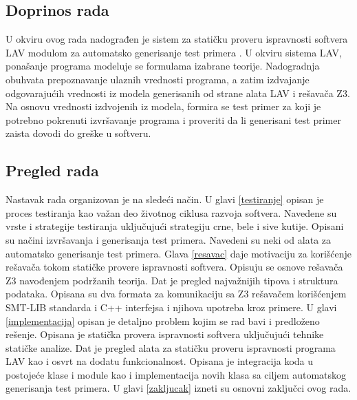 \documentclass[12pt,oneside]{memoir}
\begin{document}
\subsection{Doprinos rada}

U okviru ovog rada nadograđen je sistem za statičku proveru ispravnosti softvera LAV modulom za automatsko generisanje test primera \cite{LAVTool}. U okviru sistema
LAV, ponašanje programa modeluje se formulama izabrane teorije. Nadogradnja obuhvata prepoznavanje ulaznih vrednosti programa, a zatim izdvajanje odgovarajućih vrednosti iz modela generisanih od strane alata LAV i rešavača Z3. Na osnovu vrednosti izdvojenih iz modela, formira se test primer za koji je potrebno pokrenuti izvršavanje programa i proveriti da li generisani test primer zaista dovodi do greške u softveru.

\subsection{Pregled rada}
Nastavak rada organizovan je na sledeći način. U glavi \ref{testiranje} opisan je proces testiranja kao važan deo životnog ciklusa razvoja softvera. Navedene su vrste i strategije testiranja uključujući strategiju crne, bele i sive kutije. Opisani su načini izvršavanja i generisanja test primera. Navedeni su neki od alata za automatsko generisanje test primera. Glava \ref{resavac} daje motivaciju za korišćenje rešavača tokom statičke provere ispravnosti softvera. Opisuju se osnove rešavača Z3 navođenjem podržanih teorija. Dat je pregled najvažnijih tipova i struktura podataka. Opisana su dva formata za komunikaciju sa Z3 rešavačem korišćenjem SMT-LIB standarda i C++ interfejsa i njihova upotreba kroz primere. U glavi \ref{implementacija} opisan je detaljno problem kojim se rad bavi i predloženo rešenje. Opisana je statička provera ispravnosti softvera uključujući tehnike statičke analize. Dat je pregled alata za statičku proveru ispravnosti programa LAV kao i osvrt na dodatu funkcionalnost. Opisana je integracija koda u postojeće klase i module kao i implementacija novih klasa sa ciljem automatskog generisanja test primera. U glavi \ref{zakljucak} izneti su osnovni zaključci ovog rada.



\end{document}
